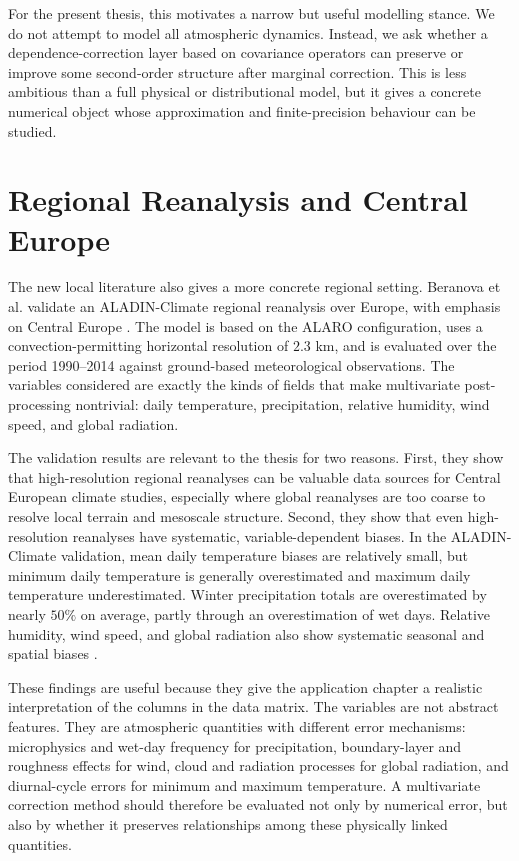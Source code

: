 For the present thesis, this motivates a narrow but useful modelling stance. We
do not attempt to model all atmospheric dynamics. Instead, we ask whether a
dependence-correction layer based on covariance operators can preserve or improve
some second-order structure after marginal correction. This is less ambitious
than a full physical or distributional model, but it gives a concrete numerical
object whose approximation and finite-precision behaviour can be studied.

\section{Regional Reanalysis and Central Europe}

The new local literature also gives a more concrete regional setting. Beranova
et al. validate an ALADIN-Climate regional reanalysis over Europe, with emphasis
on Central Europe \cite{beranova2025aladin}. The model is based on the ALARO
configuration, uses a convection-permitting horizontal resolution of \(2.3\) km,
and is evaluated over the period 1990--2014 against ground-based meteorological
observations. The variables considered are exactly the kinds of fields that make
multivariate post-processing nontrivial: daily temperature, precipitation,
relative humidity, wind speed, and global radiation.

The validation results are relevant to the thesis for two reasons. First, they
show that high-resolution regional reanalyses can be valuable data sources for
Central European climate studies, especially where global reanalyses are too
coarse to resolve local terrain and mesoscale structure. Second, they show that
even high-resolution reanalyses have systematic, variable-dependent biases. In
the ALADIN-Climate validation, mean daily temperature biases are relatively small,
but minimum daily temperature is generally overestimated and maximum daily
temperature underestimated. Winter precipitation totals are overestimated by
nearly \(50\%\) on average, partly through an overestimation of wet days. Relative
humidity, wind speed, and global radiation also show systematic seasonal and
spatial biases \cite{beranova2025aladin}.

These findings are useful because they give the application chapter a realistic
interpretation of the columns in the data matrix. The variables are not abstract
features. They are atmospheric quantities with different error mechanisms:
microphysics and wet-day frequency for precipitation, boundary-layer and
roughness effects for wind, cloud and radiation processes for global radiation,
and diurnal-cycle errors for minimum and maximum temperature. A multivariate
correction method should therefore be evaluated not only by numerical error, but
also by whether it preserves relationships among these physically linked
quantities.

